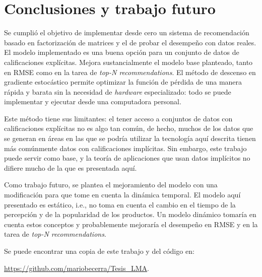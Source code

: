 
\chapter{Conclusiones y trabajo futuro}
\label{ch:conclusiones}

Se cumplió el objetivo de implementar desde cero un sistema de recomendación basado en factorización de matrices y el de probar el desempeño con datos reales. El modelo implementado es una buena opción para un conjunto de datos de calificaciones explícitas. Mejora sustancialmente el modelo base planteado, tanto en RMSE como en la tarea de \textit{top-N recommendations}. El método de descenso en gradiente estocástico permite optimizar la función de pérdida de una manera rápida y barata sin la necesidad de \textit{hardware} especializado: todo se puede implementar y ejecutar desde una computadora personal.

Este método tiene sus limitantes: el tener acceso a conjuntos de datos con calificaciones explícitas no es algo tan común, de hecho, muchos de los datos que se generan en áreas en las que se podría utilizar la tecnología aquí descrita tienen más comúnmente datos con calificaciones implícitas. Sin embargo, este trabajo puede servir como base, y la teoría de aplicaciones que usan datos implícitos no difiere mucho de la que es presentada aquí.

Como trabajo futuro, se plantea el mejoramiento del modelo con una modificación para que tome en cuenta la dinámica temporal. El modelo aquí presentado es estático, i.e., no toma en cuenta el cambio en el tiempo de la percepción y de la popularidad de los productos. Un modelo dinámico tomaría en cuenta estos conceptos y probablemente mejoraría el desempeño en RMSE y en la tarea de \textit{top-N recommendations}.

Se puede encontrar una copia de este trabajo y del código en:

\url{https://github.com/mariobecerra/Tesis_LMA}.
